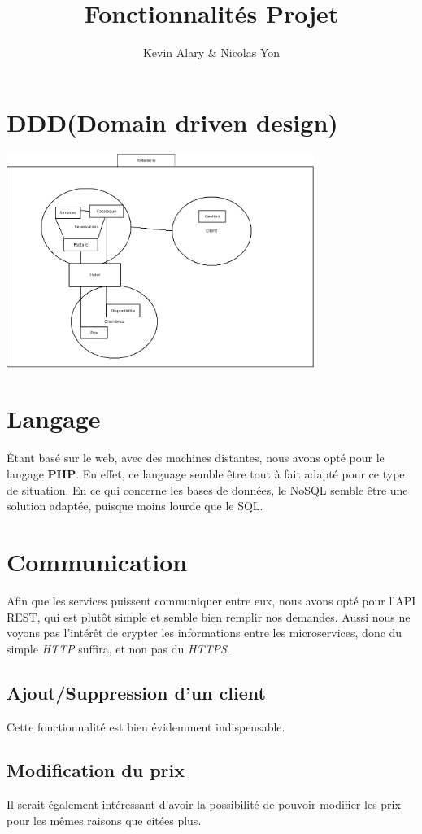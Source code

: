\documentclass{article}
\title{Fonctionnalit\'es Projet}
\author{Kevin Alary \& Nicolas Yon}
\date{}
\begin{document}
\maketitle

\section{DDD(Domain driven design)}
\includegraphics[width=10cm]{ddd.png} \\


\section{Langage}
\'Etant bas\'e sur le web, avec des machines distantes, nous avons opt\'e pour le langage \textbf{PHP}. En effet, ce language semble \^{e}tre tout \`a fait adapt\'e pour ce type de situation. En ce qui concerne les bases de donn\'ees, le NoSQL semble \^{e}tre une solution adapt\'ee, puisque moins lourde que le SQL.

\section{Communication}
Afin que les services puissent communiquer entre eux, nous avons opt\'e pour l'API REST, qui est plut\^{o}t simple et semble bien remplir nos demandes. Aussi nous ne voyons pas l'int\'er\^{e}t de crypter les informations entre les microservices, donc du simple \textit{HTTP} suffira, et non pas du \textit{HTTPS}.

\subsection{Ajout/Suppression d'un client}
Cette fonctionnalit\'e est bien \'evidemment indispensable.


\subsection{Modification du prix}
Il serait \'egalement int\'eressant d'avoir la possibilit\'e de pouvoir modifier les prix pour les m\^{e}mes raisons que cit\'ees plus.
\end{document}
